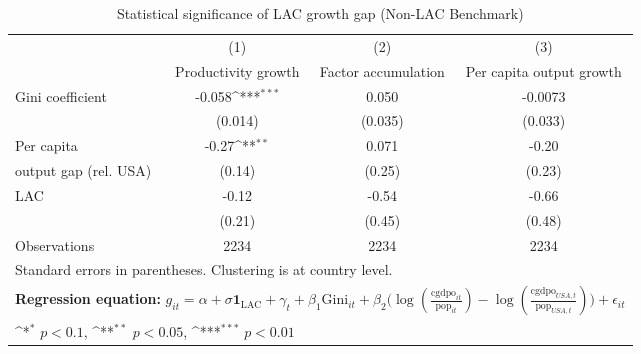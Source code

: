 \begin{table}[htbp]\centering
\def\sym#1{\ifmmode^{#1}\else\(^{#1}\)\fi}
\caption{Statistical significance of LAC growth gap (Non-LAC Benchmark)}
\begin{tabular}{l*{3}{c}}
\toprule
                &\multicolumn{1}{c}{(1)}&\multicolumn{1}{c}{(2)}&\multicolumn{1}{c}{(3)}\\
                &\multicolumn{1}{c}{Productivity growth}&\multicolumn{1}{c}{Factor accumulation}&\multicolumn{1}{c}{Per capita output growth}\\
\midrule
Gini coefficient     &   -0.058\sym{***}&    0.050         &  -0.0073         \\
           &  (0.014)         &  (0.035)         &  (0.033)         \\
\addlinespace
Per capita      &    -0.27\sym{**} &    0.071         &    -0.20         \\
output gap (rel. USA)&   (0.14)         &   (0.25)         &   (0.23)         \\
\addlinespace
LAC             &    -0.12         &    -0.54         &    -0.66         \\
                &   (0.21)         &   (0.45)         &   (0.48)         \\
\midrule
Observations    &     2234         &     2234         &     2234         \\
\bottomrule
\multicolumn{4}{l}{\footnotesize Standard errors in parentheses. Clustering is at country level.}\\
\multicolumn{4}{l}{\footnotesize \textbf{Regression equation:} \(g_{it} = \alpha + \sigma \mathbf{1}_{\textrm{LAC}} + \gamma_t + \beta_1 \text{Gini}_{it} + \beta_2 \big(\log (\frac{\textrm{cgdpo}_{it}}{\textrm{pop}_{it}} ) - \log (\frac{\textrm{cgdpo}_{USA,t}}{\textrm{pop}_{USA,t}}  ) \big) + \epsilon_{it}\)}\\
\multicolumn{4}{l}{\footnotesize \sym{*} \(p<0.1\), \sym{**} \(p<0.05\), \sym{***} \(p<0.01\)}\\
\end{tabular}
\end{table}
